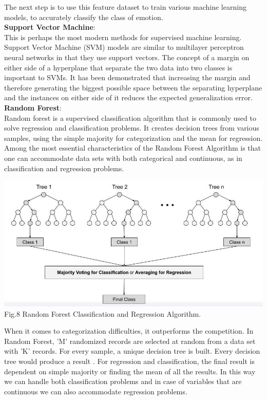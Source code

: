 \documentclass[11pt,a4paper]{article}
\begin{document}
The next step is to use this feature dataset to train various machine learning models, to accurately classify the class of emotion. \\
\textbf{Support Vector Machine}: \\
This is perhaps the most modern methods for supervised machine learning. Support Vector Machine (SVM) models are similar to multilayer perceptron neural networks in that they use support vectors. The concept of a margin on either side of a hyperplane that separate the two data into two classes is important to SVMs.  It has been demonstrated that increasing the margin and therefore generating the biggest possible space between the separating hyperplane and the instances on either side of it reduces the expected generalization error.\\
\textbf{Random Forest}: \\
Random forest is a supervised classification algorithm that is commonly used to solve regression and classification problems. It creates decision trees from various samples, using the simple majority for categorization and the mean for regression. Among the most essential characteristics of the Random Forest Algorithm is that one can accommodate data sets with both categorical and continuous, as in classification and regression problems.
    \begin{center}
	
	\includegraphics[scale=0.35]{random_forest.png} \\ 
	Fig.8 Random Forest Classification and Regression Algorithm. \cite{random_forest2021} \\
	
\end{center} 
 When it comes to categorization difficulties, it outperforms the competition. In Random Forest, 'M' randomized records are selected at random from a data set with 'K' records. For every sample, a unique decision tree is built. Every decision tree would produce a result \cite{pal2005random}. For regression and classification, the final result is dependent on simple majority or finding the mean of all the results. In this way we can handle both classification problems and in case of variables that are continuous we can also accommodate regression problems. \\ 
 
\end{document}
